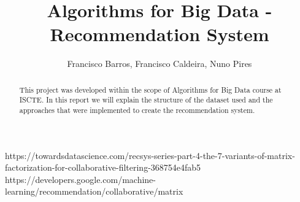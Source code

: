 \documentclass{article}
\title{Algorithms for Big Data - Recommendation System}
\author{Francisco Barros, Francisco Caldeira, Nuno Pires}
\begin{document}
\maketitle

\begin{abstract}
    This project was developed within the scope of Algorithms for Big Data course at ISCTE. 
    In this report we will explain the structure of the dataset used and the approaches that were implemented to create the recommendation system.
\end{abstract}









https://towardsdatascience.com/recsys-series-part-4-the-7-variants-of-matrix-factorization-for-collaborative-filtering-368754e4fab5
https://developers.google.com/machine-learning/recommendation/collaborative/matrix
\end{document}
